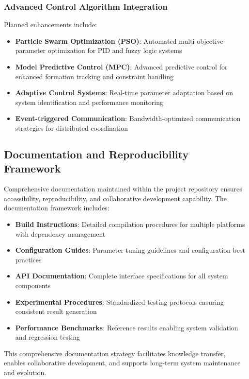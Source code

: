 \subsubsection*{Advanced Control Algorithm Integration}

Planned enhancements include:
\begin{itemize}
    \item \textbf{Particle Swarm Optimization (PSO)}: Automated multi-objective parameter optimization for PID and fuzzy logic systems
    \item \textbf{Model Predictive Control (MPC)}: Advanced predictive control for enhanced formation tracking and constraint handling
    \item \textbf{Adaptive Control Systems}: Real-time parameter adaptation based on system identification and performance monitoring
    \item \textbf{Event-triggered Communication}: Bandwidth-optimized communication strategies for distributed coordination
\end{itemize}

\subsection*{Documentation and Reproducibility Framework}

Comprehensive documentation maintained within the project repository ensures accessibility, reproducibility, and collaborative development capability. The documentation framework includes:

\begin{itemize}
    \item \textbf{Build Instructions}: Detailed compilation procedures for multiple platforms with dependency management
    \item \textbf{Configuration Guides}: Parameter tuning guidelines and configuration best practices
    \item \textbf{API Documentation}: Complete interface specifications for all system components
    \item \textbf{Experimental Procedures}: Standardized testing protocols ensuring consistent result generation
    \item \textbf{Performance Benchmarks}: Reference results enabling system validation and regression testing
\end{itemize}

This comprehensive documentation strategy facilitates knowledge transfer, enables collaborative development, and supports long-term system maintenance and evolution.

